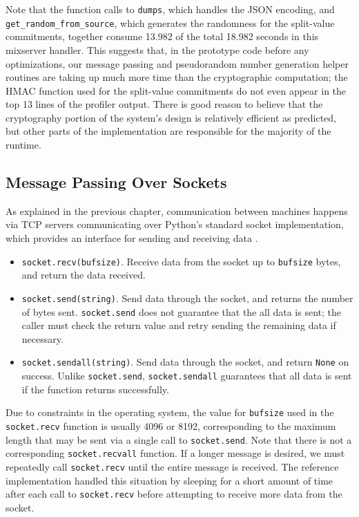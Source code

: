 Note that the function calls to \texttt{dumps}, which handles the JSON encoding, and \\
\texttt{get\_random\_from\_source}, which generates the randomness for the split-value commitments, together consume 13.982 of the total 18.982 seconds in this mixserver handler. This suggests that, in the prototype code before any optimizations, our message passing and pseudorandom number generation helper routines are taking up much more time than the cryptographic computation; the HMAC function used for the split-value commitments do not even appear in the top 13 lines of the profiler output. There is good reason to believe that the cryptography portion of the system's design is relatively efficient as predicted, but other parts of the implementation are responsible for the majority of the runtime.

\subsection{Message Passing Over Sockets} \label{perf:optimizations:sockets}

As explained in the previous chapter, communication between machines happens via TCP servers communicating over Python's standard socket implementation, which provides an interface for sending and receiving data \cite{python-sockets}.
\begin{itemize}
\item \texttt{socket.recv(bufsize)}. Receive data from the socket up to \texttt{bufsize} bytes, and return the data received.
\item \texttt{socket.send(string)}. Send data through the socket, and returns the number of bytes sent. \texttt{socket.send} does not guarantee that the all data is sent; the caller must check the return value and retry sending the remaining data if necessary.
\item \texttt{socket.sendall(string)}. Send data through the socket, and return \texttt{None} on success. Unlike \texttt{socket.send}, \texttt{socket.sendall} guarantees that all data is sent if the function returns successfully.
\end{itemize}

Due to constraints in the operating system, the value for \texttt{bufsize} used in the \texttt{socket.recv} function is usually 4096 or 8192, corresponding to the maximum length that may be sent via a single call to \texttt{socket.send}. Note that there is not a corresponding \texttt{socket.recvall} function. If a longer message is desired, we must repeatedly call \texttt{socket.recv} until the entire message is received. The reference implementation handled this situation by sleeping for a short amount of time after each call to \texttt{socket.recv} before attempting to receive more data from the socket.

